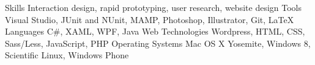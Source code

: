   \begin{cvskills}
  	\cvskill
		{Skills}
		{Interaction design, rapid prototyping, user research, website design}
	\cvskill
		{Tools}
		{Visual Studio, JUnit and NUnit, MAMP, Photoshop, Illustrator, Git, LaTeX}
    \cvskill
      {Languages}
      {C\#, XAML, WPF, Java}
  	\cvskill
		{Web Technologies}
		{Wordpress, HTML, CSS, Sass/Less, JavaScript, PHP}
  	\cvskill
		{Operating Systems}
		{Mac OS X Yosemite, Windows 8, Scientific Linux, Windows Phone}
  \end{cvskills}
